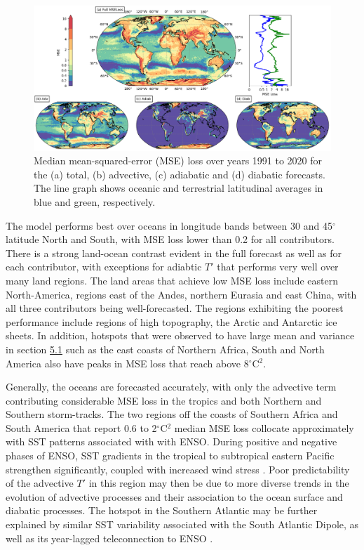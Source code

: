 \documentclass[11pt,a4paper,twoside,openright]{report}
\theoremstyle{definition}
\begin{document}
\begin{figure}[h]
\includegraphics[width=1\linewidth]{images/mse_final} \caption{Median mean-squared-error (MSE) loss over years 1991 to 2020 for the (a) total, (b) advective, (c) adiabatic and (d) diabatic forecasts. The line graph shows oceanic and terrestrial latitudinal averages in blue and green, respectively.}\label{fig:mse}
\end{figure}

The model performs best over oceans in longitude bands between 30 and 45\(^\circ\) latitude North and South, with MSE loss lower than 0.2 for all contributors. There is a strong land-ocean contrast evident in the full forecast as well as for each contributor, with exceptions for adiabtic \(T'\) that performs very well over many land regions. The land areas that achieve low MSE loss include eastern North-America, regions east of the Andes, northern Eurasia and east China, with all three contributors being well-forecasted. The regions exhibiting the poorest performance include regions of high topography, the Arctic and Antarctic ice sheets. In addition, hotspots that were observed to have large mean and variance in section \hyperref[relating-tx1day-t-variability-to-component-variability]{5.1} such as the east coasts of Northern Africa, South and North America also have peaks in MSE loss that reach above 8\(^\circ\)C\(^2\).

Generally, the oceans are forecasted accurately, with only the advective term contributing considerable MSE loss in the tropics and both Northern and Southern storm-tracks. The two regions off the coasts of Southern Africa and South America that report 0.6 to 2\(^\circ\)C\(^2\) median MSE loss collocate approximately with SST patterns associated with with ENSO. During positive and negative phases of ENSO, SST gradients in the tropical to subtropical eastern Pacific strengthen significantly, coupled with increased wind stress \citep[for e.g.][]{chelton_observations_2001}. Poor predictability of the advective \(T'\) in this region may then be due to more diverse trends in the evolution of advective processes and their association to the ocean surface and diabatic processes. The hotspot in the Southern Atlantic may be further explained by similar SST variability associated with the South Atlantic Dipole, as well as its year-lagged teleconnection to ENSO \citep{ham_inter-basin_2021}.
\end{document}
